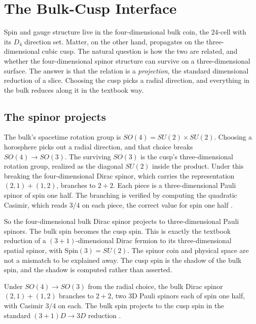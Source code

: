 \section{The Bulk-Cusp Interface}

Spin and gauge structure live in the four-dimensional bulk coin, the $24$-cell with its $D_4$ direction set.
Matter, on the other hand, propagates on the three-dimensional cubic cusp. The natural question is how the two
are related, and whether the four-dimensional spinor structure can survive on a three-dimensional surface. The
answer is that the relation is a \emph{projection}, the standard dimensional reduction of a slice. Choosing the
cusp picks a radial direction, and everything in the bulk reduces along it in the textbook way.

\subsection{The spinor projects}

The bulk's spacetime rotation group is $SO(4) = SU(2) \times SU(2)$. Choosing a horosphere picks out a radial
direction, and that choice breaks $SO(4) \to SO(3)$. The surviving $SO(3)$ is the cusp's three-dimensional
rotation group, realized as the diagonal $SU(2)$ inside the product. Under this breaking the four-dimensional
Dirac spinor, which carries the representation $(2,1) + (1,2)$, branches to $2 + 2$. Each piece is a
three-dimensional Pauli spinor of spin one half. The branching is verified by computing the quadratic Casimir,
which reads $3/4$ on each piece, the correct value for spin one half \cite{pollard2026vibetest}.

So the four-dimensional bulk Dirac spinor projects to three-dimensional Pauli spinors. The bulk spin becomes the
cusp spin. This is exactly the textbook reduction of a $(3+1)$-dimensional Dirac fermion to its
three-dimensional spatial spinor, with $\mathrm{Spin}(3) = SU(2)$. The spinor coin and physical space are not a
mismatch to be explained away. The cusp spin is the shadow of the bulk spin, and the shadow is computed rather
than asserted.

\begin{result}
Under $SO(4) \to SO(3)$ from the radial choice, the bulk Dirac spinor $(2,1)+(1,2)$ branches to $2+2$, two 3D
Pauli spinors each of spin one half, with Casimir $3/4$ on each. The bulk spin projects to the cusp spin in the
standard $(3+1)D \to 3D$ reduction \cite{pollard2026vibetest}.
\end{result}

